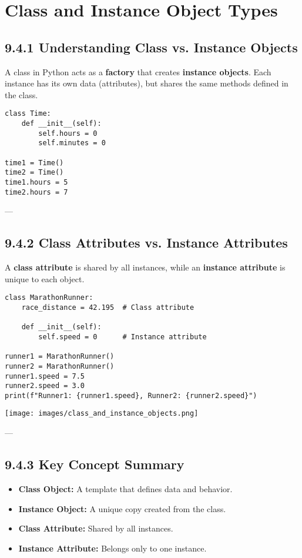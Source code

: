 \chapter{Class and Instance Object Types}

\section*{9.4.1 Understanding Class vs. Instance Objects}

A class in Python acts as a \textbf{factory} that creates \textbf{instance objects}. 
Each instance has its own data (attributes), but shares the same methods defined in the class.

\begin{verbatim}
class Time:
    def __init__(self):
        self.hours = 0
        self.minutes = 0

time1 = Time()
time2 = Time()
time1.hours = 5
time2.hours = 7
\end{verbatim}

---

\section*{9.4.2 Class Attributes vs. Instance Attributes}

A \textbf{class attribute} is shared by all instances, while an \textbf{instance attribute} is unique to each object.

\begin{verbatim}
class MarathonRunner:
    race_distance = 42.195  # Class attribute

    def __init__(self):
        self.speed = 0      # Instance attribute

runner1 = MarathonRunner()
runner2 = MarathonRunner()
runner1.speed = 7.5
runner2.speed = 3.0
print(f"Runner1: {runner1.speed}, Runner2: {runner2.speed}")
\end{verbatim}

\begin{center}
\texttt{[image: images/class\_and\_instance\_objects.png]}
\end{center}

---

\section*{9.4.3 Key Concept Summary}

\begin{itemize}
    \item \textbf{Class Object:} A template that defines data and behavior.
    \item \textbf{Instance Object:} A unique copy created from the class.
    \item \textbf{Class Attribute:} Shared by all instances.
    \item \textbf{Instance Attribute:} Belongs only to one instance.
\end{itemize}

